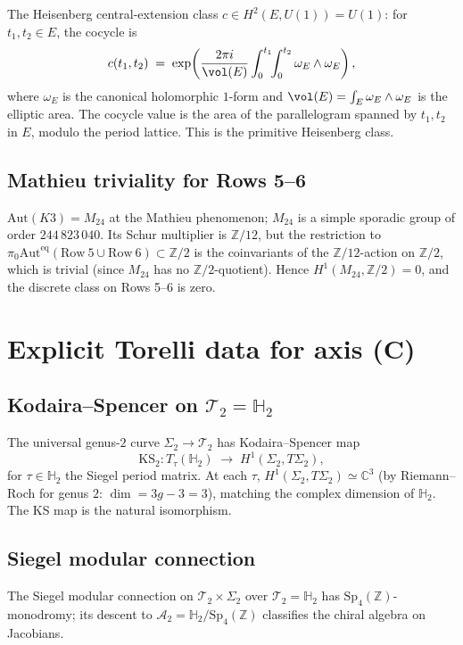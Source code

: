 \documentclass[11pt]{article}
\newcommand{\C}{\mathbb{C}}
\newcommand{\Z}{\mathbb{Z}}
\newcommand{\cA}{\mathcal{A}}
\newcommand{\cT}{\mathcal{T}}
\newcommand{\Aut}{\mathrm{Aut}}
\newcommand{\Auteq}{\mathrm{Aut}^{\mathrm{eq}}}
\begin{document}
The Heisenberg central-extension class $c \in H^2(E, U(1)) = U(1)$: for
$t_1, t_2 \in E$, the cocycle is
\[
  c(t_1, t_2) \;=\; \exp\!\left(\frac{2\pi i}{\vol(E)} \int_0^{t_1} \!\!\int_0^{t_2}
  \omega_E \wedge \overline\omega_E\right),
\]
where $\omega_E$ is the canonical holomorphic $1$-form and
$\vol(E) = \int_E \omega_E \wedge \overline\omega_E$ is the elliptic
area. The cocycle value is the area of the parallelogram spanned by
$t_1, t_2$ in $E$, modulo the period lattice. This is the
primitive Heisenberg class.

\subsection{Mathieu triviality for Rows 5--6}

$\Aut(K3) = M_{24}$ at the Mathieu phenomenon; $M_{24}$ is a simple
sporadic group of order $244\,823\,040$. Its Schur multiplier is
$\Z/12$, but the restriction to
$\pi_0 \Auteq(\mathrm{Row}\ 5 \cup \mathrm{Row}\ 6) \subset \Z/2$ is
the coinvariants of the $\Z/12$-action on $\Z/2$, which is trivial
(since $M_{24}$ has no $\Z/2$-quotient). Hence $H^1(M_{24}, \Z/2) = 0$,
and the discrete class on Rows 5--6 is zero.

\section{Explicit Torelli data for axis (C)}
\label{app:torelli-C}

\subsection{Kodaira--Spencer on $\cT_2 = \mathbb H_2$}

The universal genus-$2$ curve $\Sigma_2 \to \cT_2$ has Kodaira--Spencer
map
\[
  \mathrm{KS}_2 : T_\tau(\mathbb H_2) \;\to\; H^{1}(\Sigma_2, T \Sigma_2),
\]
for $\tau \in \mathbb H_2$ the Siegel period matrix. At each $\tau$,
$H^{1}(\Sigma_2, T \Sigma_2) \simeq \C^3$ (by Riemann--Roch for
genus $2$: $\dim = 3g - 3 = 3$), matching the complex dimension of
$\mathbb H_2$. The KS map is the natural isomorphism.

\subsection{Siegel modular connection}

The Siegel modular connection on $\cT_2 \times \Sigma_2$ over
$\cT_2 = \mathbb H_2$ has $\mathrm{Sp}_4(\Z)$-monodromy; its descent to
$\cA_2 = \mathbb H_2 / \mathrm{Sp}_4(\Z)$ classifies the chiral algebra on
Jacobians.
\end{document}
